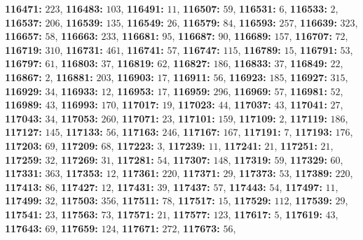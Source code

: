 \textsf{\bfseries 116471:} $223$, \textsf{\bfseries 116483:} $103$, \textsf{\bfseries 116491:} $11$, \textsf{\bfseries 116507:} $59$, \textsf{\bfseries 116531:} $6$, \textsf{\bfseries 116533:} $2$, \textsf{\bfseries 116537:} $206$, \textsf{\bfseries 116539:} $135$, \textsf{\bfseries 116549:} $26$, \textsf{\bfseries 116579:} $84$, \textsf{\bfseries 116593:} $257$, \textsf{\bfseries 116639:} $323$, \textsf{\bfseries 116657:} $58$, \textsf{\bfseries 116663:} $233$, \textsf{\bfseries 116681:} $95$, \textsf{\bfseries 116687:} $90$, \textsf{\bfseries 116689:} $157$, \textsf{\bfseries 116707:} $72$, \textsf{\bfseries 116719:} $310$, \textsf{\bfseries 116731:} $461$, \textsf{\bfseries 116741:} $57$, \textsf{\bfseries 116747:} $115$, \textsf{\bfseries 116789:} $15$, \textsf{\bfseries 116791:} $53$, \textsf{\bfseries 116797:} $61$, \textsf{\bfseries 116803:} $37$, \textsf{\bfseries 116819:} $62$, \textsf{\bfseries 116827:} $186$, \textsf{\bfseries 116833:} $37$, \textsf{\bfseries 116849:} $22$, \textsf{\bfseries 116867:} $2$, \textsf{\bfseries 116881:} $203$, \textsf{\bfseries 116903:} $17$, \textsf{\bfseries 116911:} $56$, \textsf{\bfseries 116923:} $185$, \textsf{\bfseries 116927:} $315$, \textsf{\bfseries 116929:} $34$, \textsf{\bfseries 116933:} $12$, \textsf{\bfseries 116953:} $17$, \textsf{\bfseries 116959:} $296$, \textsf{\bfseries 116969:} $57$, \textsf{\bfseries 116981:} $52$, \textsf{\bfseries 116989:} $43$, \textsf{\bfseries 116993:} $170$, \textsf{\bfseries 117017:} $19$, \textsf{\bfseries 117023:} $44$, \textsf{\bfseries 117037:} $43$, \textsf{\bfseries 117041:} $27$, \textsf{\bfseries 117043:} $34$, \textsf{\bfseries 117053:} $260$, \textsf{\bfseries 117071:} $23$, \textsf{\bfseries 117101:} $159$, \textsf{\bfseries 117109:} $2$, \textsf{\bfseries 117119:} $186$, \textsf{\bfseries 117127:} $145$, \textsf{\bfseries 117133:} $56$, \textsf{\bfseries 117163:} $246$, \textsf{\bfseries 117167:} $167$, \textsf{\bfseries 117191:} $7$, \textsf{\bfseries 117193:} $176$, \textsf{\bfseries 117203:} $69$, \textsf{\bfseries 117209:} $68$, \textsf{\bfseries 117223:} $3$, \textsf{\bfseries 117239:} $11$, \textsf{\bfseries 117241:} $21$, \textsf{\bfseries 117251:} $21$, \textsf{\bfseries 117259:} $32$, \textsf{\bfseries 117269:} $31$, \textsf{\bfseries 117281:} $54$, \textsf{\bfseries 117307:} $148$, \textsf{\bfseries 117319:} $59$, \textsf{\bfseries 117329:} $60$, \textsf{\bfseries 117331:} $363$, \textsf{\bfseries 117353:} $12$, \textsf{\bfseries 117361:} $220$, \textsf{\bfseries 117371:} $29$, \textsf{\bfseries 117373:} $53$, \textsf{\bfseries 117389:} $220$, \textsf{\bfseries 117413:} $86$, \textsf{\bfseries 117427:} $12$, \textsf{\bfseries 117431:} $39$, \textsf{\bfseries 117437:} $57$, \textsf{\bfseries 117443:} $54$, \textsf{\bfseries 117497:} $11$, \textsf{\bfseries 117499:} $32$, \textsf{\bfseries 117503:} $356$, \textsf{\bfseries 117511:} $78$, \textsf{\bfseries 117517:} $15$, \textsf{\bfseries 117529:} $112$, \textsf{\bfseries 117539:} $29$, \textsf{\bfseries 117541:} $23$, \textsf{\bfseries 117563:} $73$, \textsf{\bfseries 117571:} $21$, \textsf{\bfseries 117577:} $123$, \textsf{\bfseries 117617:} $5$, \textsf{\bfseries 117619:} $43$, \textsf{\bfseries 117643:} $69$, \textsf{\bfseries 117659:} $124$, \textsf{\bfseries 117671:} $272$, \textsf{\bfseries 117673:} $56$, 
